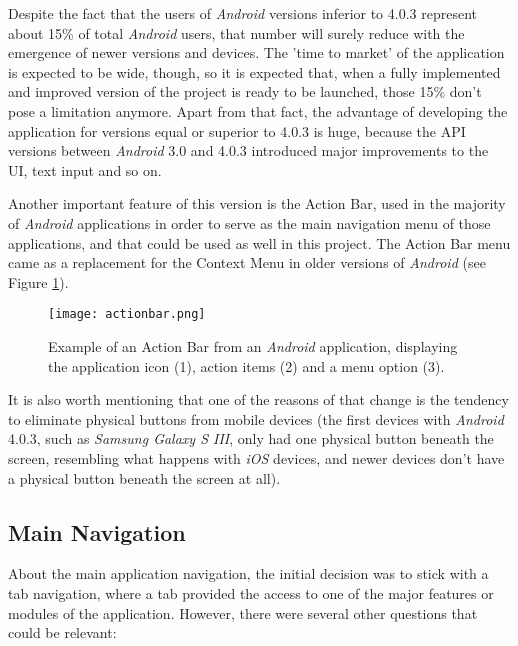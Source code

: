 Despite the fact that the users of \emph{Android} versions inferior to 4.0.3 represent about 15\% of total \emph{Android} users, that number will surely reduce with the emergence of newer versions and devices. The 'time to market' of the application is expected to be wide, though, so it is expected that, when a fully implemented and improved version of the project is ready to be launched, those 15\% don't pose a limitation anymore. Apart from that fact, the advantage of developing the application for versions equal or superior to 4.0.3 is huge, because the API versions between \emph{Android} 3.0 and 4.0.3 introduced major improvements to the UI, text input and so on. 

Another important feature of this version is the Action Bar, used in the majority of \emph{Android} applications in order to serve as the main navigation menu of those applications, and that could be used as well in this project. The Action Bar menu came as a replacement for the Context Menu in older versions of \emph{Android} (see Figure \ref{fig:action}).

\clearpage

\begin{figure}[h!]
  \begin{center}
    \leavevmode
    \texttt{[image: actionbar.png]}
    \caption{Example of an Action Bar from an \emph{Android} application, displaying the application icon (1), action items (2) and a menu option (3).}
    \label{fig:action}
  \end{center}
\end{figure}

It is also worth mentioning that one of the reasons of that change is the tendency to eliminate physical buttons from mobile devices (the first devices with \emph{Android} 4.0.3, such as \emph{Samsung Galaxy S III}, only had one physical button beneath the screen, resembling what happens with \emph{iOS} devices, and newer devices don't have a physical button beneath the screen at all).  

\subsection{Main Navigation}

About the main application navigation, the initial decision was to stick with a tab navigation, where a tab provided the access to one of the major features or modules of the application. However, there were several other questions that could be relevant:


